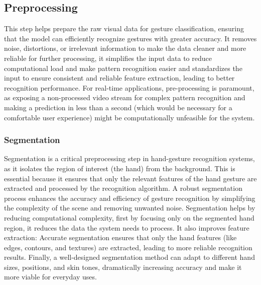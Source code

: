 \documentclass[12pt]{article}
\begin{document}
\subsection{Preprocessing}

This step helps prepare the raw visual data for gesture classification, ensuring that the model can efficiently recognize gestures with greater accuracy. It removes noise, distortions, or irrelevant information to make the data cleaner and more reliable for further processing, it simplifies the input data to reduce computational load and make pattern recognition easier and standardizes the input to ensure consistent and reliable feature extraction, leading to better recognition performance. For real-time applications, pre-processing is paramount, as exposing a non-processed video stream for complex pattern recognition and making a prediction in less than a second (which would be necessary for a comfortable user experience) might be computationally unfeasible for the system.

\subsubsection{Segmentation}

Segmentation is a critical preprocessing step in hand-gesture recognition systems, as it isolates the region of interest (the hand) from the background. This is essential because it ensures that only the relevant features of the hand gesture are extracted and processed by the recognition algorithm. A robust segmentation process enhances the accuracy and efficiency of gesture recognition by simplifying the complexity of the scene and removing unwanted noise.
Segmentation helps by reducing computational complexity, first by focusing only on the segmented hand region, it reduces the data the system needs to process. It also improves feature extraction: Accurate segmentation ensures that only the hand features (like edges, contours, and textures) are extracted, leading to more reliable recognition results. Finally, a well-designed segmentation method can adapt to different hand sizes, positions, and skin tones, dramatically increasing accuracy and make it more viable for everyday uses.
\end{document}
